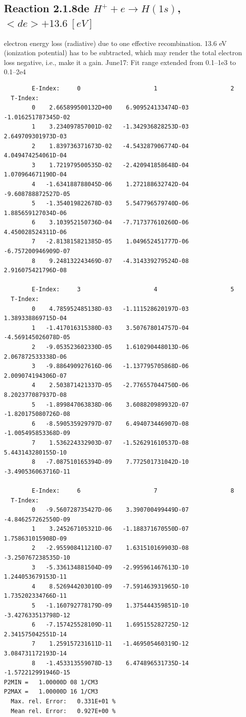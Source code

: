 \documentclass[12pt,dvipdfmx]{article}
\begin{document}
\subsection{
  Reaction 2.1.8de $H^+  + e \rightarrow H(1s) $, \  $<de> + 13.6 \ [eV] $
}

  electron energy loss (radiative) due to one effective recombination.
  13.6 eV (ionization potential) has to be
  subtracted, which may render the total electron loss negative, i.e., make it a gain.
  June17: Fit range extended from 0.1--1e3 to 0.1--2e4

\begin{small}\begin{verbatim}
        E-Index:     0                     1                     2
  T-Index:
        0    2.665899500132D+00    6.909524133474D-03   -1.016251787345D-02
        1    3.234097857001D-02   -1.342936828253D-03    2.649709301973D-03
        2    1.839736371673D-02   -4.543287906774D-04    4.049474254061D-04
        3    1.721979500535D-02   -2.420941858648D-04    1.070964671190D-04
        4   -1.634188788045D-06    1.272188632742D-04   -9.608788872527D-05
        5   -1.354019822678D-03    5.547796579740D-06    1.885659127034D-06
        6    3.103952150736D-04   -7.717377610260D-06    4.450028524311D-06
        7   -2.813815821385D-05    1.049652451777D-06   -6.757200946909D-07
        8    9.248132243469D-07   -4.314339279524D-08    2.916075421796D-08

        E-Index:     3                     4                     5
  T-Index:
        0    4.785952485138D-03   -1.111528620197D-03    1.389338869715D-04
        1   -1.417016315380D-03    3.507678014757D-04   -4.569145026078D-05
        2   -9.053523602330D-05    1.610290448013D-06    2.067872533338D-06
        3   -9.886490927616D-06   -1.137795705868D-06    2.009074194306D-07
        4    2.503871421337D-05   -2.776557044750D-06    8.202377087937D-08
        5   -1.899847063838D-06    3.608820989932D-07   -1.820175080726D-08
        6   -8.590535929797D-07    6.494073446907D-08   -1.005495853368D-09
        7    1.536224332903D-07   -1.526291610537D-08    5.443143280155D-10
        8   -7.087510165394D-09    7.772501731042D-10   -3.490536063716D-11

        E-Index:     6                     7                     8
  T-Index:
        0   -9.560728735427D-06    3.390700499449D-07   -4.846257262550D-09
        1    3.245267105321D-06   -1.188371670550D-07    1.758631015908D-09
        2   -2.955908411210D-07    1.631510169903D-08   -3.250767238535D-10
        3   -5.336134881504D-09   -2.995961467613D-10    1.244053679153D-11
        4    8.526944203010D-09   -7.591463931965D-10    1.735202334766D-11
        5   -1.160792778179D-09    1.375444359851D-10   -3.427633513798D-12
        6   -7.157425528109D-11    1.695155282725D-12    2.341575042551D-14
        7    1.259157231611D-11   -1.469505460319D-12    3.084731172193D-14
        8   -1.453313559078D-13    6.474896531735D-14   -1.572212991946D-15
P2MIN =   1.00000D 08 1/CM3
P2MAX =   1.00000D 16 1/CM3
  Max. rel. Error:   0.331E+01 %
  Mean rel. Error:   0.927E+00 %

\end{verbatim}\end{small}
\end{document}
